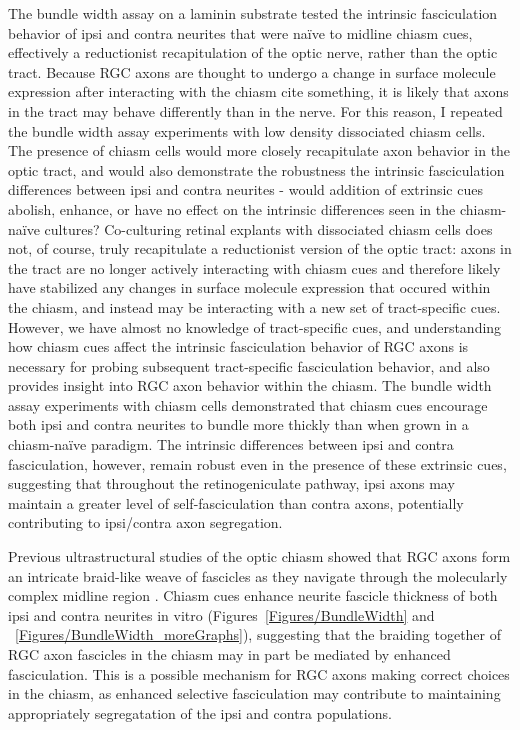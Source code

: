 The bundle width assay on a laminin substrate tested the intrinsic fasciculation behavior of ipsi and contra neurites that were na\"ive to midline chiasm cues, effectively a reductionist recapitulation of the optic nerve, rather than the optic tract.
Because RGC axons are thought to undergo a change in surface molecule expression after interacting with the chiasm {cite something}, it is likely that axons in the tract may behave differently than in the nerve.
For this reason, I repeated the bundle width assay experiments with low density dissociated chiasm cells.
The presence of chiasm cells would more closely recapitulate axon behavior in the optic tract, and would also demonstrate the robustness the intrinsic fasciculation differences between ipsi and contra neurites - would addition of extrinsic cues abolish, enhance, or have no effect on the intrinsic differences seen in the chiasm-na\"ive cultures?
Co-culturing retinal explants with dissociated chiasm cells does not, of course, truly recapitulate a reductionist version of the optic tract: axons in the tract are no longer actively interacting with chiasm cues and therefore likely have stabilized any changes in surface molecule expression that occured within the chiasm, and instead may be interacting with a new set of tract-specific cues.
However, we have almost no knowledge of tract-specific cues, and understanding how chiasm cues affect the intrinsic fasciculation behavior of RGC axons is necessary for probing subsequent tract-specific fasciculation behavior, and also provides insight into RGC axon behavior within the chiasm.
The bundle width assay experiments with chiasm cells demonstrated that chiasm cues encourage both ipsi and contra neurites to bundle more thickly than when grown in a chiasm-na\"ive paradigm.
The intrinsic differences between ipsi and contra fasciculation, however, remain robust even in the presence of these extrinsic cues, suggesting that throughout the retinogeniculate pathway, ipsi axons may maintain a greater level of self-fasciculation than contra axons, potentially contributing to ipsi/contra axon segregation.

Previous ultrastructural studies of the optic chiasm showed that RGC axons form an intricate braid-like weave of fascicles as they navigate through the molecularly complex midline region \cite{colello1998changing}.
Chiasm cues enhance neurite fascicle thickness of both ipsi and contra neurites in vitro (Figures~\ref{Figures/BundleWidth} and ~\ref{Figures/BundleWidth_moreGraphs}), suggesting that the braiding together of RGC axon fascicles in the chiasm may in part be mediated by enhanced fasciculation.
This is a possible mechanism for RGC axons making correct choices in the chiasm, as enhanced selective fasciculation may contribute to maintaining appropriately segregatation of the ipsi and contra populations.

